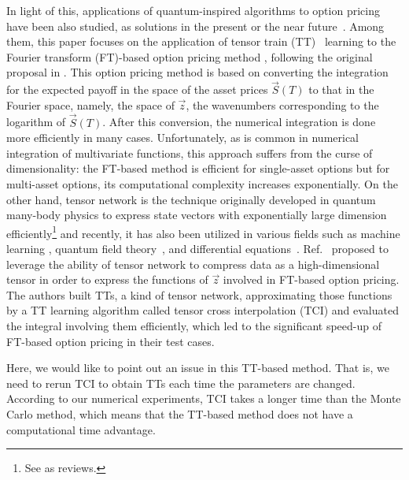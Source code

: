 In light of this, applications of quantum-inspired algorithms to option pricing have been also studied, as solutions in the present or the near future~\cite{doi:10.1137/19M1244172,kastoryano2022highly,patel2022quantuminspired, doi:10.1137/21M1402170}.
Among them, this paper focuses on the application of tensor train (TT)~\cite{Oseledets2011} learning to the Fourier transform (FT)-based option pricing method \cite{carr1999option,lewis2001simple}, following the original proposal in \cite{kastoryano2022highly}.
This option pricing method is based on converting the integration for the expected payoff in the space of the asset prices $\vec{S}(T)$ to that in the Fourier space, namely, the space of $\vec{z}$, the wavenumbers corresponding to the logarithm of $\vec{S}(T)$. 
After this conversion, the numerical integration is done more efficiently in many cases.
Unfortunately, as is common in numerical integration of multivariate functions, this approach suffers from the curse of dimensionality: the FT-based method is efficient for single-asset options but for multi-asset options, its computational complexity increases exponentially.
On the other hand, tensor network is the technique originally developed in quantum many-body physics to express state vectors with exponentially large dimension efficiently\footnote{See \cite{ORUS2014117,Okunishi2022} as reviews.} and recently, it has also been utilized in various fields such as machine learning \cite{Stoudenmire2016,novikov2016exponential}, quantum field theory~\cite{Shinaoka2023-lf, Nunez_Fernandez2022-fo}, and differential equations~\cite{patel2022quantuminspired, PhysRevE.106.035208}.
Ref.~\cite{kastoryano2022highly} proposed to leverage the ability of tensor network to compress data as a high-dimensional tensor in order to express the functions of $\vec{z}$ involved in FT-based option pricing.
The authors built TTs, a kind of tensor network, approximating those functions by a TT learning algorithm called tensor cross interpolation (TCI) \cite{Oseledets2010-fg,Dolgov2020-yi, Nunez_Fernandez2022-fo, Ritter2024-pr} and evaluated the integral involving them efficiently, which led to the significant speed-up of FT-based option pricing in their test cases.

Here, we would like to point out an issue in this TT-based method.
That is, we need to rerun TCI to obtain TTs each time the parameters are changed.
According to our numerical experiments, TCI takes a longer time than the Monte Carlo method, which means that the TT-based method does not have a computational time advantage.

